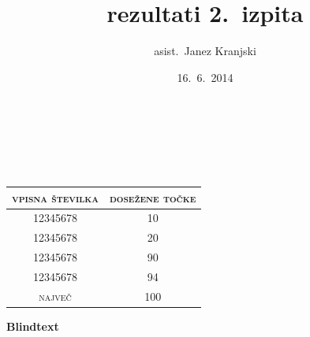 \documentclass[12pt,a4paper]{letter}
\title{rezultati 2.~izpita}
\author{asist.~Janez Kranjski}
\date{16.~6.~2014}
\makeatletter
\newcommand{\@subject}{}
\renewcommand{\maketitle}{\begin{center}
\textbf{\huge \@subject}\\[1cm]
\textit{\Large \@title}\\[3mm]
\textit{\large \@date}\\
\end{center}}
\newcommand{\makesmalltitle}{\begin{center}
\textbf{\huge \@subject}\\[4mm]
\textit{\Large \@title, \large \@date}\\[3mm]
\end{center}}
\newcommand{\myname}{\@author}
\makeatother
\begin{document}

\maketitle

\vspace{2.5cm}

\begin{center}
\renewcommand{\arraystretch}{1.5}
\begin{tabular}{c|c}
\textsc{vpisna številka} & \textsc{dosežene točke} \\\hline
12345678 & 10 \\
12345678 & 20 \\
12345678 & 90 \\
12345678 & 94 \\\hline
\textsc{največ} & 100
\end{tabular}
\end{center}

\vfill
\myname
\vspace{2cm}

\newpage


\textbf{Blindtext}

\Blindtext
\end{document}
